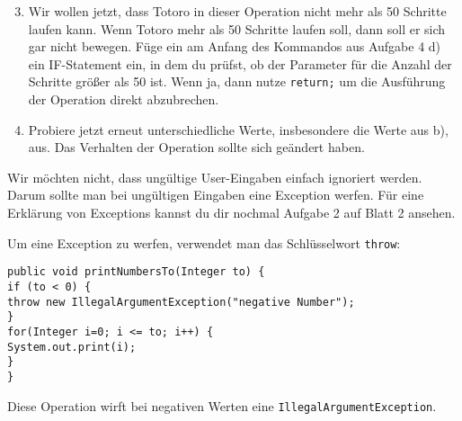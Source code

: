 \begin{enumerate}\setcounter{enumi}{2}
\item
Wir wollen jetzt, dass Totoro in dieser Operation nicht mehr als 50 Schritte laufen kann.
Wenn Totoro mehr als 50 Schritte laufen soll, dann soll er sich gar nicht bewegen.
Füge ein am Anfang des Kommandos aus Aufgabe 4 d) ein IF-Statement ein, in dem du prüfst, ob der Parameter für die Anzahl der Schritte größer als 50 ist.
Wenn ja, dann nutze \lstinline{return;} um die Ausführung der Operation direkt abzubrechen.

\item
Probiere jetzt erneut unterschiedliche Werte, insbesondere die Werte aus b), aus.
Das Verhalten der Operation sollte sich geändert haben.
\end{enumerate}

\medskip %

\begin{Infobox}
	Wir möchten nicht, dass ungültige User-Eingaben einfach ignoriert werden.
Darum sollte man bei ungültigen Eingaben eine Exception werfen.
Für eine Erklärung von Exceptions kannst du dir nochmal Aufgabe 2 auf Blatt 2 ansehen.\newline

Um eine Exception zu werfen, verwendet man das Schlüsselwort \lstinline{throw}:

\begin{lstlisting}[xleftmargin=0.5cm]
public void printNumbersTo(Integer to) {
if (to < 0) {
throw new IllegalArgumentException("negative Number");
}
for(Integer i=0; i <= to; i++) {
System.out.print(i);
}
}
\end{lstlisting}

Diese Operation wirft bei negativen Werten eine \lstinline{IllegalArgumentException}.
\end{Infobox}


